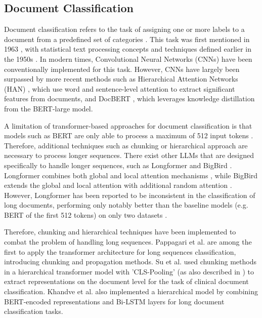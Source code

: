 \subsection{Document Classification}

Document classification refers to the task of assigning one or more labels to a document from a predefined set of categories \cite{wan-2019-long-length}. This task was first mentioned in 1963 \cite{borko-1963-auto-doc-classification}, with statistical text processing concepts and techniques defined earlier in the 1950s \cite{luhn-1958-business-intelligence-system}. In modern times, Convolutional Neural Networks (CNNs) \cite{afzal-deepdocclassifier,liu-2017-xmlcnn} have been conventionally implemented for this task. However, CNNs have largely been surpassed by more recent methods such as Hierarchical Attention Networks (HAN) \cite{yang-2016-han}, which use word and sentence-level attention to extract significant features from documents, and DocBERT \cite{adhikari-2019-docbert}, which leverages knowledge distillation from the BERT-large model.

A limitation of transformer-based approaches for document classification is that models such as BERT are only able to process a maximum of 512 input tokens \cite{devlin-2019-bert}. Therefore, additional techniques such as chunking or hierarchical approach are necessary to process longer sequences. There exist other LLMs that are designed specifically to handle longer sequences, such as Longformer \cite{beltagy-2020-longformer} and BigBird \cite{zaheer-2021-bigbird}. Longformer combines both global and local attention mechanisms \cite{beltagy-2020-longformer}, while BigBird extends the global and local attention with additional random attention \cite{zaheer-2021-bigbird}. However, Longformer has been reported to be inconsistent in the classification of long documents, performing only notably better than the baseline models (e.g. BERT of the first 512 tokens) on only two datasets \cite{park-2022-efficient}.

Therefore, chunking and hierarchical techniques have been implemented to combat the problem of handling long sequences. Pappagari et al. \cite{pappagari-2019-hierarchical} are among the first to apply the transformer architecture for long sequences classification, introducing chunking and propagation methods. Su et al. \cite{su-2021-classifying} used chunking methods in a hierarchical transformer model with 'CLS-Pooling' (as also described in \cite{adhikari-2019-docbert}) to extract representations on the document level for the task of clinical document classification. Khandve et al. \cite{khandve-2022-hierarchical-longdoc} also implemented a hierarchical model by combining BERT-encoded representations and Bi-LSTM layers for long document classification tasks.


